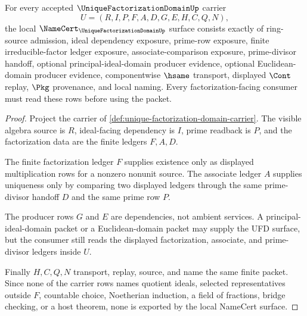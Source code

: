 \begin{theorem}
\label{thm:unique-factorization-domain-namecert-obligations}
For every accepted $\UniqueFactorizationDomainUp$ carrier
$$
U=(R,I,P,F,A,D,G,E,H,C,Q,N),
$$
the local $\NameCert_{\UniqueFactorizationDomainUp}$ surface consists exactly of ring-source admission, ideal dependency exposure, prime-row exposure, finite irreducible-factor ledger exposure, associate-comparison exposure, prime-divisor handoff, optional principal-ideal-domain producer evidence, optional Euclidean-domain producer evidence, componentwise $\hsame$ transport, displayed $\Cont$ replay, $\Pkg$ provenance, and local naming. Every factorization-facing consumer must read these rows before using the packet.
\end{theorem}
\begin{proof}
Project the carrier of \autoref{def:unique-factorization-domain-carrier}. The visible algebra source is $R$, ideal-facing dependency is $I$, prime readback is $P$, and the factorization data are the finite ledgers $F,A,D$.

The finite factorization ledger $F$ supplies existence only as displayed multiplication rows for a nonzero nonunit source. The associate ledger $A$ supplies uniqueness only by comparing two displayed ledgers through the same prime-divisor handoff $D$ and the same prime row $P$.

The producer rows $G$ and $E$ are dependencies, not ambient services. A principal-ideal-domain packet or a Euclidean-domain packet may supply the UFD surface, but the consumer still reads the displayed factorization, associate, and prime-divisor ledgers inside $U$.

Finally $H,C,Q,N$ transport, replay, source, and name the same finite packet. Since none of the carrier rows names quotient ideals, selected representatives outside $F$, countable choice, Noetherian induction, a field of fractions, bridge checking, or a host theorem, none is exported by the local NameCert surface.
\end{proof}


